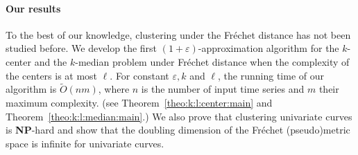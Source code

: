 \documentclass[11pt, letter]{article}
\newcommand{\thmref}[1]{Theorem~\ref{theo:#1}}
\newcommand{\NP}{\textbf{NP}} \newcommand{\spine}{\textsl{spine}}
\newcommand{\Frechet}{Fr\'echet\xspace}
\providecommand{\eps}{{\varepsilon}}\newcommand{\Astop}{\overline{a}}
\begin{document}
\paragraph{Our results} 

To the best of our knowledge, clustering under the \Frechet{} distance has not been studied before. 
We develop the first $(1+\eps)$-approximation algorithm for the $k$-center and the $k$-median problem 
under \Frechet{} distance when the complexity of the centers is at most $\ell$. For constant $\eps, 
k$ and $\ell$, the running time of our algorithm is $\widetilde O(nm)$, where $n$ is the number of input 
time series and $m$ their maximum complexity. (see \thmref{k:l:center:main} and \thmref{k:l:median:main}.)
We also prove that clustering univariate curves is \NP-hard and show that the doubling dimension of the 
\Frechet{} (pseudo)metric space is infinite for univariate curves.
\end{document}
